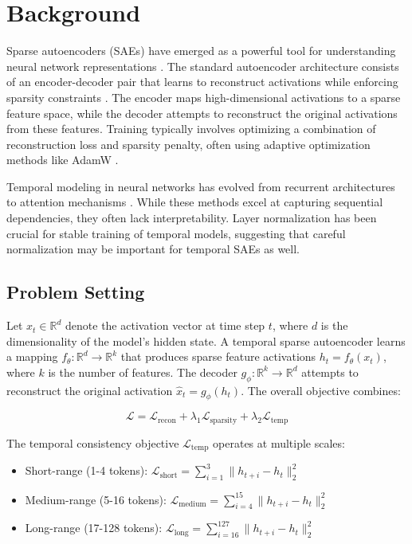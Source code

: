 \documentclass{article} %
\begin{document}
\section{Background}
\label{sec:background}

Sparse autoencoders (SAEs) have emerged as a powerful tool for understanding neural network representations \cite{karpathy2023nanogpt}. The standard autoencoder architecture consists of an encoder-decoder pair that learns to reconstruct activations while enforcing sparsity constraints \cite{goodfellow2016deep}. The encoder maps high-dimensional activations to a sparse feature space, while the decoder attempts to reconstruct the original activations from these features. Training typically involves optimizing a combination of reconstruction loss and sparsity penalty, often using adaptive optimization methods like AdamW \cite{loshchilov2017adamw}.

Temporal modeling in neural networks has evolved from recurrent architectures to attention mechanisms \cite{vaswani2017attention}. While these methods excel at capturing sequential dependencies, they often lack interpretability. Layer normalization \cite{ba2016layer} has been crucial for stable training of temporal models, suggesting that careful normalization may be important for temporal SAEs as well.

\subsection{Problem Setting}
Let $x_t \in \mathbb{R}^d$ denote the activation vector at time step $t$, where $d$ is the dimensionality of the model's hidden state. A temporal sparse autoencoder learns a mapping $f_\theta: \mathbb{R}^d \rightarrow \mathbb{R}^k$ that produces sparse feature activations $h_t = f_\theta(x_t)$, where $k$ is the number of features. The decoder $g_\phi: \mathbb{R}^k \rightarrow \mathbb{R}^d$ attempts to reconstruct the original activation $\hat{x}_t = g_\phi(h_t)$. The overall objective combines:

\begin{equation}
\mathcal{L} = \mathcal{L}_{\text{recon}} + \lambda_1\mathcal{L}_{\text{sparsity}} + \lambda_2\mathcal{L}_{\text{temp}}
\end{equation}

The temporal consistency objective $\mathcal{L}_{\text{temp}}$ operates at multiple scales:
\begin{itemize}
    \item Short-range (1-4 tokens): $\mathcal{L}_{\text{short}} = \sum_{i=1}^3 \|h_{t+i} - h_t\|_2^2$
    \item Medium-range (5-16 tokens): $\mathcal{L}_{\text{medium}} = \sum_{i=4}^{15} \|h_{t+i} - h_t\|_2^2$
    \item Long-range (17-128 tokens): $\mathcal{L}_{\text{long}} = \sum_{i=16}^{127} \|h_{t+i} - h_t\|_2^2$
\end{itemize}
\end{document}
